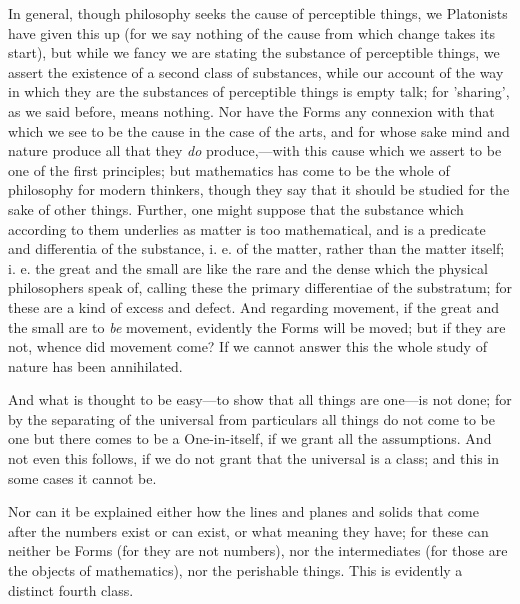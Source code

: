 In general, though philosophy seeks the cause of perceptible things, we Platonists have given this up (for we say nothing of the cause from which change takes its start), but while we fancy we are stating the substance of perceptible things, we assert the existence of a second class of substances, while our account of the way in which they are the substances of perceptible things is empty talk; for 'sharing', as we said before, means nothing. Nor have the Forms any connexion with that which we see to be the cause in the case of the arts, and for whose sake mind and nature produce all that they \emph{do} produce,—with this cause which we assert to be one of the first principles; but mathematics has come to be the whole of philosophy for modern thinkers, though they say that it should be studied for the sake of other things. Further, one might suppose that the substance which according to them underlies as matter is too mathematical, and is a predicate and differentia of the substance, i. e. of the matter, rather than the matter itself; i. e. the great and the small are like the rare and the dense which the physical philosophers speak of, calling these the primary differentiae of the substratum; for these are a kind of excess and defect. And regarding movement, if the great and the small are to \emph{be} movement, evidently the Forms will be moved; but if they are not, whence did movement come? If we cannot answer this the whole study of nature has been annihilated.

And what is thought to be easy—to show that all things are one—is not done; for by the separating of the universal from particulars all things do not come to be one but there comes to be a One-in-itself, if we grant all the assumptions. And not even this follows, if we do not grant that the universal is a class; and this in some cases it cannot be.

Nor can it be explained either how the lines and planes and solids that come after the numbers exist or can exist, or what meaning they have; for these can neither be Forms (for they are not numbers), nor the intermediates (for those are the objects of mathematics), nor the perishable things. This is evidently a distinct fourth class.

